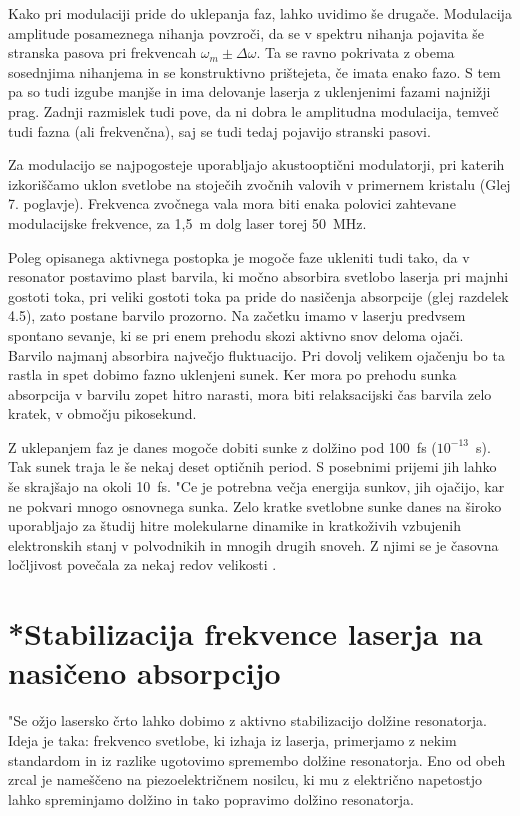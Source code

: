 Kako pri modulaciji pride do uklepanja faz, lahko uvidimo še drugače.
Modulacija amplitude posameznega nihanja povzroči, da se v spektru nihanja
pojavita še stranska pasova pri frekvencah $\omega_m \pm \Delta\omega$. Ta
se ravno pokrivata z obema sosednjima nihanjema in se konstruktivno
prištejeta, če imata enako fazo. S tem pa so tudi izgube manjše in ima
delovanje laserja z uklenjenimi fazami najnižji prag. Zadnji razmislek
tudi pove, da ni dobra le amplitudna modulacija, temveč tudi fazna (ali
frekvenčna), saj se tudi tedaj pojavijo stranski pasovi.

Za modulacijo se najpogosteje uporabljajo akustooptični modulatorji, pri
katerih izkoriščamo uklon svetlobe na stoječih zvočnih valovih v
primernem kristalu (Glej 7. poglavje). Frekvenca zvočnega vala mora biti
enaka polovici zahtevane modulacijske frekvence, za 1,5~m dolg laser torej
50~MHz.

Poleg opisanega aktivnega postopka je mogoče faze ukleniti tudi tako, da v
resonator postavimo plast barvila, ki močno absorbira svetlobo laserja pri
majnhi gostoti toka, pri veliki gostoti toka pa pride do nasičenja
absorpcije (glej razdelek 4.5), zato postane barvilo prozorno. Na začetku
imamo v laserju predvsem spontano sevanje, ki se pri enem prehodu skozi
aktivno snov deloma ojači. Barvilo najmanj absorbira največjo fluktuacijo.
Pri dovolj velikem ojačenju bo ta rastla in spet dobimo fazno uklenjeni
sunek. Ker mora po prehodu sunka absorpcija v barvilu zopet hitro narasti,
mora biti relaksacijski čas barvila zelo kratek, v območju pikosekund.

Z uklepanjem faz je danes mogoče dobiti sunke z dolžino pod 100~fs ($%
10^{-13}$~s). Tak sunek traja le še nekaj deset optičnih period. S
posebnimi prijemi jih lahko še skrajšajo na okoli 10~fs. "Ce je potrebna
večja energija sunkov, jih ojačijo, kar ne pokvari mnogo osnovnega sunka.
Zelo kratke svetlobne sunke danes na široko uporabljajo za študij hitre
molekularne dinamike in kratkoživih vzbujenih elektronskih stanj v
polvodnikih in mnogih drugih snoveh. Z njimi se je časovna ločljivost
povečala za nekaj redov velikosti \cite{pikosekunde}.

\section{*Stabilizacija frekvence laserja na na\-sičeno absorpcijo}
\label{chap:stabilizacija}

"Se ožjo lasersko črto lahko dobimo z aktivno stabilizacijo dolžine
resonatorja. Ideja je taka: frekvenco svetlobe, ki izhaja iz laserja,
primerjamo z nekim standardom in iz razlike ugotovimo spremembo dolžine
resonatorja. Eno od obeh zrcal je nameščeno na piezoelektričnem nosilcu,
ki mu z električno napetostjo lahko spreminjamo dolžino in tako popravimo
dolžino resonatorja.

